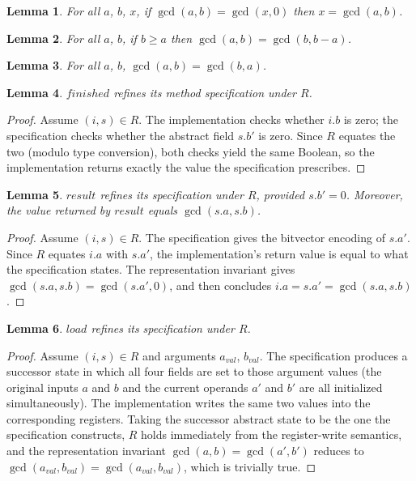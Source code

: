 \documentclass[fontset=fira-newtxsf]{mitthesis}
\theoremstyle{definition}
\theoremstyle{plain}
\newtheorem{lemma}{Lemma}[section]
\begin{document}
\begin{lemma} \label{lem:gcd-zero}
For all $a$, $b$, $x$, if $\gcd(a, b) = \gcd(x, 0)$ then $x = \gcd(a, b)$.
\end{lemma}

\begin{lemma} \label{lem:gcd-subtract}
For all $a$, $b$, if $b \geq a$ then $\gcd(a, b) = \gcd(b, b - a)$.
\end{lemma}

\begin{lemma} \label{lem:gcd-swap}
For all $a$, $b$, $\gcd(a, b) = \gcd(b, a)$.
\end{lemma}

\begin{lemma}\label{lem:gcd-finished-refines}
$\mathit{finished}$ refines its method specification under $R$.
\end{lemma}

\begin{proof}[Proof]
Assume $(i, s) \in R$.
The implementation checks whether $i.b$ is zero; the specification checks whether the abstract field $s.b'$ is zero.
Since $R$ equates the two (modulo type conversion), both checks yield the same Boolean, so the implementation returns exactly the value the specification prescribes.
\end{proof}

\begin{lemma} \label{lem:gcd-result-refines}
 $\mathit{result}$ refines its specification under $R$, provided $s.b' = 0$.
Moreover, the value returned by $\mathit{result}$ equals $\gcd(s.a, s.b)$.
\end{lemma}

\begin{proof}[Proof]
Assume $(i, s) \in R$.
The specification gives the bitvector encoding of $s.a'$. Since $R$ equates $i.a$ with $s.a'$, the implementation's return value is equal to what the specification states.
The representation invariant gives $\gcd(s.a, s.b) = \gcd(s.a', 0)$, and  then concludes $i.a = s.a' = \gcd(s.a, s.b)$.
\end{proof}

\begin{lemma} \label{lem:gcd-load-refines}
$\mathit{load}$ refines its specification under $R$.
\end{lemma}

\begin{proof}[Proof]
Assume $(i, s) \in R$ and arguments $a_{\mathit{val}}$, $b_{\mathit{val}}$.
The specification produces a successor state in which all four fields are set to those argument values (the original inputs $a$ and $b$ and the current operands $a'$ and $b'$ are all initialized simultaneously).
The implementation writes the same two values into the corresponding registers.
Taking the successor abstract state to be the one the specification constructs, $R$ holds immediately from the register-write semantics, and the representation invariant $\gcd(a, b) = \gcd(a', b')$ reduces to $\gcd(a_{\mathit{val}}, b_{\mathit{val}}) = \gcd(a_{\mathit{val}}, b_{\mathit{val}})$, which is trivially true.
\end{proof}
\end{document}
